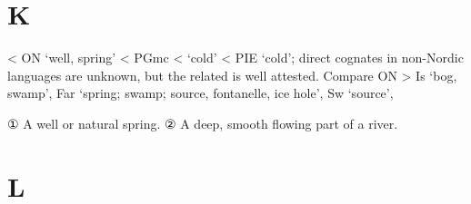 \documentclass[12pt,letterpaper,oneside,article,draft]{memoir}
\begin{document}
\section*{K}

\begin{Lemma}
\begin{Etymology}
	< ON  ‘well, spring’ < PGmc  <  ‘cold’ < PIE  ‘cold’;
		direct cognates in non-Nordic languages are unknown, but the related  is well attested.
	Compare
	ON  > Is  ‘bog, swamp’, Far  ‘spring; swamp; source, fontanelle, ice hole’,
		Sw  ‘source’, 
\end{Etymology}
\begin{Definitions}
	① A well or natural spring.
	② A deep, smooth flowing part of a river.
\end{Definitions}
\end{Lemma}

\section*{L}
\end{document}
